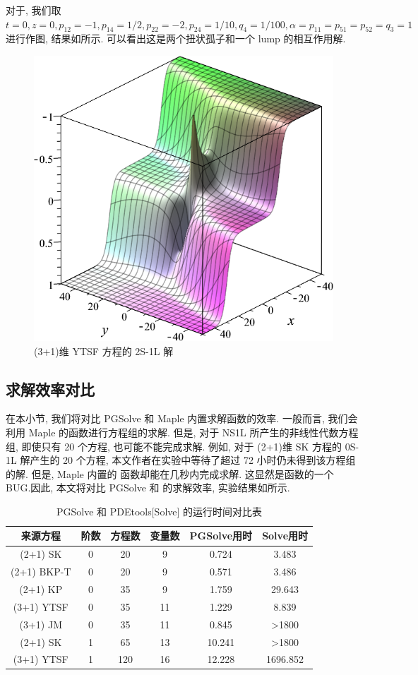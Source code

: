 对于, 我们取 $t=0,z=0,p_{12}=-1,p_{14}=1/2,p_{22}=-2,p_{24}=1/10,q_4=1/100,\alpha=p_{11}=p_{51}=p_{52}=q_3=1$进行作图, 结果如所示. 可以看出这是两个扭状孤子和一个 lump 的相互作用解.

\begin{figure}[htbp]
\centering
\includegraphics[width=.6\textwidth]{fig/2S1L.png}
\caption{(3+1)维 YTSF 方程的 2S-1L 解} \label{fig-2S1L}
\end{figure}

\subsection{求解效率对比}

在本小节, 我们将对比 PGSolve 和 Maple 内置求解函数的效率. 一般而言, 我们会利用 Maple 的函数进行方程组的求解. 但是, 对于 NS1L 所产生的非线性代数方程组, 即使只有 20 个方程, 也可能不能完成求解. 例如, 对于 (2+1)维 SK 方程的 0S-1L 解产生的 20 个方程, 本文作者在实验中等待了超过 72 小时仍未得到该方程组的解. 但是, Maple 内置的  函数却能在几秒内完成求解. 这显然是函数的一个 BUG.因此, 本文将对比 PGSolve 和  的求解效率, 实验结果如所示. 

\begin{table}[htbp]
\centering
\caption{PGSolve 和 PDEtools[Solve] 的运行时间对比表} \label{NS1L-cmp}
\begin{tabular}{cccccc}
\hline
来源方程 & 阶数 & 方程数 & 变量数 & PGSolve用时 & Solve用时 \\
\hline
(2+1) SK & 0 & 20 & 9 & 0.724 & 3.483 \\
(2+1) BKP-T & 0 & 20 & 9 & 0.571 & 3.486 \\
(2+1) KP & 0 & 35 & 9 & 1.759 & 29.643 \\
(3+1) YTSF & 0 & 35 & 11 & 1.229 & 8.839 \\
(3+1) JM & 0 & 35 & 11 & 0.845 & >1800 \\
(2+1) SK & 1 & 65 & 13 & 10.241 & >1800 \\
(3+1) YTSF & 1 & 120 & 16 & 12.228 & 1696.852 \\
\hline
\end{tabular}
\end{table}

